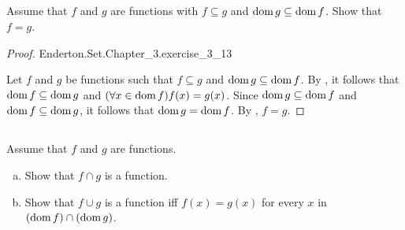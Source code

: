 \documentclass{report}
\begin{document}
\subsection{}%

Assume that $f$ and $g$ are functions with $f \subseteq g$ and
  $\mathop{\text{dom}}{g} \subseteq \mathop{\text{dom}}{f}$.
Show that $f = g$.

\begin{proof}

    {Enderton.Set.Chapter\_3.exercise\_3\_13}

  Let $f$ and $g$ be functions such that $f \subseteq g$ and
    $\mathop{\text{dom}}{g} \subseteq \mathop{\text{dom}}{f}$.
  By , it follows that $\mathop{\text{dom}}{f} \subseteq \mathop{\text{dom}}{g}$
    and $(\forall x \in \mathop{\text{dom}}{f}) f(x) = g(x)$.
  Since $\mathop{\text{dom}}{g} \subseteq \mathop{\text{dom}}{f}$ and $\mathop{\text{dom}}{f} \subseteq \mathop{\text{dom}}{g}$, it follows
    that $\mathop{\text{dom}}{g} = \mathop{\text{dom}}{f}$.
  By , $f = g$.

\end{proof}

\subsection{}%

Assume that $f$ and $g$ are functions.

\begin{enumerate}[(a)]
  \item Show that $f \cap g$ is a function.
  \item Show that $f \cup g$ is a function iff $f(x) = g(x)$ for every $x$ in
    $(\mathop{\text{dom}}{f}) \cap (\mathop{\text{dom}}{g})$.
\end{enumerate}
\end{document}
